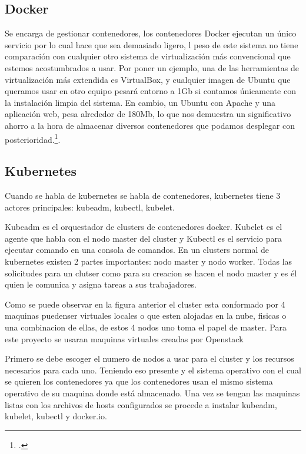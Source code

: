     \subsection{Docker}
    Se encarga de gestionar contenedores, los contenedores Docker ejecutan un único servicio por lo cual hace que sea demasiado ligero, l peso de este sistema no tiene comparación con cualquier otro sistema de virtualización más convencional que estemos acostumbrados a usar. Por poner un ejemplo, una de las herramientas de virtualización más extendida es VirtualBox, y cualquier imagen de Ubuntu que queramos usar en otro equipo pesará entorno a 1Gb si contamos únicamente con la instalación limpia del sistema. En cambio, un Ubuntu con Apache y una aplicación web, pesa alrededor de 180Mb, lo que nos demuestra un significativo ahorro a la hora de almacenar diversos contenedores que podamos desplegar con posterioridad.\footcite[][]{openwebinars}.
    
     
     \subsection{Kubernetes}
     Cuando se habla de kubernetes se habla de contenedores, kubernetes tiene 3 actores principales: kubeadm, kubectl, kubelet.
     
     Kubeadm es el orquestador de clusters de contenedores docker.
     Kubelet es el agente que habla con el nodo master del cluster y Kubectl es el servicio para ejecutar comando en una consola de comandos.
 En un  clusters normal  de kubernetes existen 2 partes importantes: nodo master y nodo worker.
 Todas las solicitudes para un clutser como para su creacion se hacen el nodo master y es él quien le comunica y asigna tareas a sus trabajadores.
 
 
      
      Como se puede observar en la figura anterior el cluster esta conformado por 4 maquinas puedenser virtuales locales o que esten alojadas en la nube, fisicas o una combinacion de ellas, de estos 4 nodos uno toma el papel de master. Para este proyecto se usaran maquinas virtuales creadas por Openstack
      
      Primero se debe escoger el numero de nodos a usar para el cluster y los recursos necesarios para cada uno.
      Teniendo eso presente y el sistema operativo con el cual se quieren los contenedores ya que los contenedores usan el mismo sistema operativo de su maquina donde está almacenado.
      Una vez se tengan las maquinas listas con los archivos de hosts configurados se procede a instalar kubeadm, kubelet, kubectl y docker.io.
      
